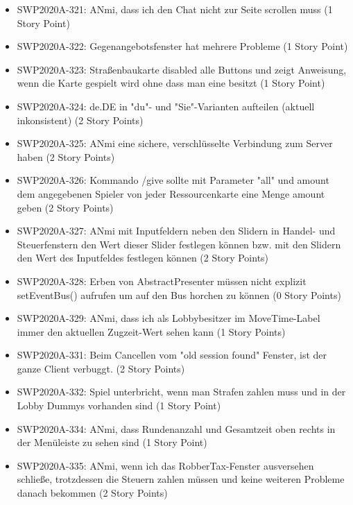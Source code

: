 \documentclass[12pt,a4paper, oneside]{article}
\begin{document}
\begin{itemize}
        \item SWP2020A-321: ANmi, dass ich den Chat nicht zur Seite scrollen muss (1 Story Point)

        \item SWP2020A-322: Gegenangebotsfenster hat mehrere Probleme (1 Story Point)

        \item SWP2020A-323: Straßenbaukarte disabled alle Buttons und zeigt Anweisung, wenn die Karte gespielt wird ohne dass man eine besitzt (1 Story Point)

        \item SWP2020A-324: de.DE in "du"- und "Sie"-Varianten aufteilen (aktuell inkonsistent) (2 Story Points)

        \item SWP2020A-325: ANmi eine sichere, verschlüsselte Verbindung zum Server haben (2 Story Points)

        \item SWP2020A-326: Kommando /give sollte mit Parameter "all" und amount dem angegebenen Spieler von jeder Ressourcenkarte eine Menge amount geben (2 Story Points)

        \item SWP2020A-327: ANmi mit Inputfeldern neben den Slidern in Handel- und Steuerfenstern den Wert dieser Slider festlegen können bzw. mit den Slidern den Wert des Inputfeldes festlegen können (2 Story Points)

        \item SWP2020A-328: Erben von AbstractPresenter müssen nicht explizit setEventBus() aufrufen um auf den Bus horchen zu können (0 Story Points)

        \item SWP2020A-329: ANmi, dass ich als Lobbybesitzer im MoveTime-Label immer den aktuellen Zugzeit-Wert sehen kann (1 Story Points)

        \item SWP2020A-331: Beim Cancellen vom "old session found" Fenster, ist der ganze Client verbuggt. (2 Story Points)

        \item SWP2020A-332: Spiel unterbricht, wenn man Strafen zahlen muss und in der Lobby Dummys vorhanden sind (1 Story Point)

        \item SWP2020A-334: ANmi, dass Rundenanzahl und Gesamtzeit oben rechts in der Menüleiste zu sehen sind (1 Story Point)

        \item SWP2020A-335: ANmi, wenn ich das RobberTax-Fenster ausversehen schließe, trotzdessen die Steuern zahlen müssen und keine weiteren Probleme danach bekommen (2 Story Points)


\end{itemize}
\end{document}
